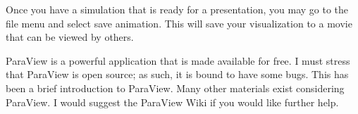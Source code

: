 \documentclass[letter,12pt,fleqn]{article}
\begin{document}
Once you have a simulation that is ready for a presentation, you may go to the file menu and select save animation. This will save your visualization to a movie that can be viewed by others.

ParaView is a powerful application that is made available for free. I must stress that ParaView is open source; as such, it is bound to have some bugs. This has been a brief introduction to ParaView. Many other materials exist considering ParaView. I would suggest the ParaView Wiki if you would like further help.


%
%
%
%
%
\end{document}
